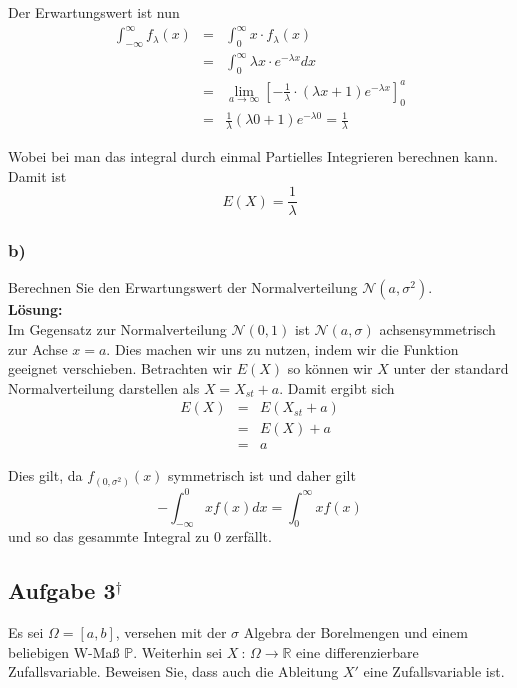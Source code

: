 \documentclass[11pt,a4paper,ngerman]{article}
\newcommand{\alex}{$^\dagger$}
\begin{document}
Der Erwartungswert ist nun
$$\begin{array}{rcl}
    \int_{-\infty}^\infty f_\lambda (x) &=& \int^\infty_0 x \cdot f_\lambda (x)\\
                &=& \int^\infty_0 \lambda x \cdot e^{-\lambda x} dx\\
                &=& \underset{a \rightarrow \infty}{\lim} \left[ - \frac{1}{\lambda} \cdot (\lambda x  + 1) e^{-\lambda x}\right]_0^a\\
                &=& \frac{1}{\lambda} (\lambda 0 + 1) e^{-\lambda 0} = \frac{1}{\lambda}
\end{array}$$

Wobei bei man das integral durch einmal Partielles Integrieren berechnen kann. Damit ist
$$E(X) = \frac{1}{\lambda}$$


\subsubsection*{b)}

Berechnen Sie den Erwartungswert der Normalverteilung $\mathcal{N}(a, \sigma^2)$.\\

\textbf{Lösung:}\\

Im Gegensatz zur Normalverteilung $\mathcal{N}(0,1)$ ist $\mathcal{N}(a,\sigma)$ achsensymmetrisch zur Achse $x = a$. Dies machen wir uns zu nutzen,
indem wir die Funktion geeignet verschieben. Betrachten wir $E(X)$ so können wir $X$ unter der standard Normalverteilung darstellen als
$X = X_{st} + a$. Damit ergibt sich
$$\begin{array}{rcl}
    E(X)    &=& E(X_{st} + a)\\
            &=& E(X) + a\\
            &=& a
\end{array}$$

Dies gilt, da $f_{(0,\sigma^2)}(x)$ symmetrisch ist und daher gilt
$$
    -\int_{-\infty}^0 x f(x) dx = \int_0^\infty x f(x)
$$
und so das gesammte Integral zu $0$ zerfällt.

\subsection*{Aufgabe 3\alex}

Es sei $\Omega = [a,b]$, versehen mit der $\sigma$ Algebra der Borelmengen und einem beliebigen W-Maß $\mathbb{P}$. Weiterhin sei $X \ : \, \Omega \rightarrow \mathbb{R}$ eine
differenzierbare Zufallsvariable. Beweisen Sie, dass auch die Ableitung $X'$ eine Zufallsvariable ist.\\
\end{document}
